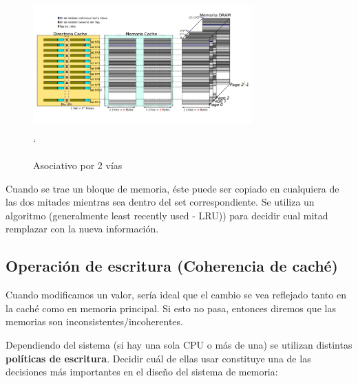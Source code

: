 \begin{figure}[ht]
	\centering
	\includegraphics[width=0.75\textwidth]{imagenes/cache-asociativo-vias}
	\caption{Asociativo por 2 vías}
`	\label{fig:asociativo-mapping}
\end{figure}

Cuando se trae un bloque de memoria, éste puede ser copiado en cualquiera de las dos mitades mientras sea dentro del set correspondiente. Se utiliza un algoritmo (generalmente least recently used - LRU)) para decidir cual mitad remplazar con la nueva información.

\subsection{Operación de escritura (Coherencia de caché)}

Cuando modificamos un valor, sería ideal que el cambio se vea reflejado tanto en la caché como en memoria principal. Si esto no pasa, entonces diremos que las memorias son inconsistentes/incoherentes.

Dependiendo del sistema (si hay una sola CPU o más de una) se utilizan distintas \textbf{políticas de escritura}. Decidir cuál de ellas usar constituye una de las decisiones más importantes en el diseño del sistema de memoria:

